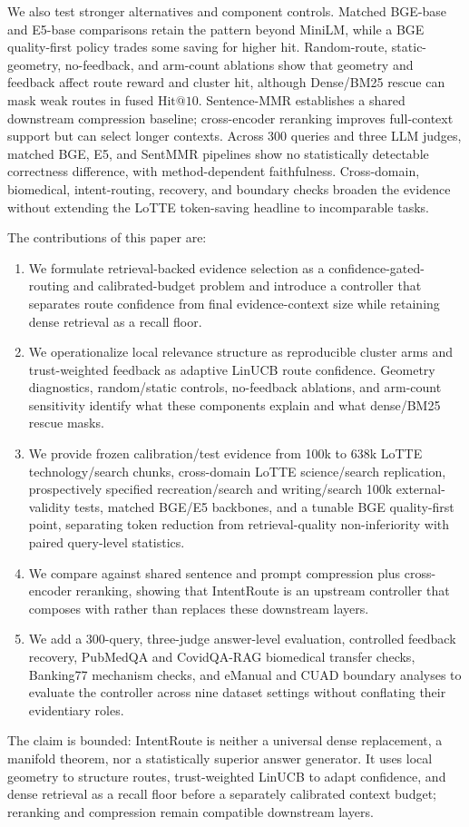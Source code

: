 We also test stronger alternatives and component controls. Matched BGE-base and E5-base comparisons retain the pattern beyond MiniLM, while a BGE quality-first policy trades some saving for higher hit. Random-route, static-geometry, no-feedback, and arm-count ablations show that geometry and feedback affect route reward and cluster hit, although Dense/BM25 rescue can mask weak routes in fused $\mathrm{Hit@10}$. Sentence-MMR establishes a shared downstream compression baseline; cross-encoder reranking improves full-context support but can select longer contexts. Across 300 queries and three LLM judges, matched BGE, E5, and SentMMR pipelines show no statistically detectable correctness difference, with method-dependent faithfulness. Cross-domain, biomedical, intent-routing, recovery, and boundary checks broaden the evidence without extending the LoTTE token-saving headline to incomparable tasks.

The contributions of this paper are:

\begin{enumerate}
\item We formulate retrieval-backed evidence selection as a confidence-gated-routing and calibrated-budget problem and introduce a controller that separates route confidence from final evidence-context size while retaining dense retrieval as a recall floor.
\item We operationalize local relevance structure as reproducible cluster arms and trust-weighted feedback as adaptive LinUCB route confidence. Geometry diagnostics, random/static controls, no-feedback ablations, and arm-count sensitivity identify what these components explain and what dense/BM25 rescue masks.
\item We provide frozen calibration/test evidence from 100k to 638k LoTTE technology/search chunks, cross-domain LoTTE science/search replication, prospectively specified recreation/search and writing/search 100k external-validity tests, matched BGE/E5 backbones, and a tunable BGE quality-first point, separating token reduction from retrieval-quality non-inferiority with paired query-level statistics.
\item We compare against shared sentence and prompt compression plus cross-encoder reranking, showing that IntentRoute is an upstream controller that composes with rather than replaces these downstream layers.
\item We add a 300-query, three-judge answer-level evaluation, controlled feedback recovery, PubMedQA and CovidQA-RAG biomedical transfer checks, Banking77 mechanism checks, and eManual and CUAD boundary analyses to evaluate the controller across nine dataset settings without conflating their evidentiary roles.
\end{enumerate}

The claim is bounded: IntentRoute is neither a universal dense replacement, a manifold theorem, nor a statistically superior answer generator. It uses local geometry to structure routes, trust-weighted LinUCB to adapt confidence, and dense retrieval as a recall floor before a separately calibrated context budget; reranking and compression remain compatible downstream layers.
